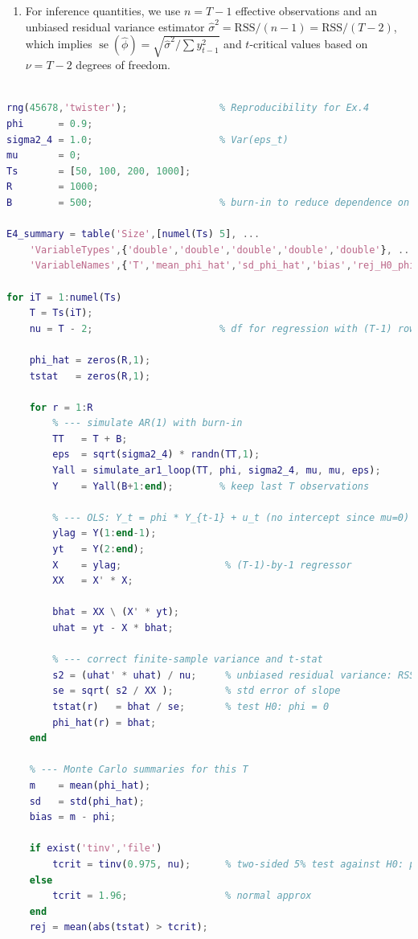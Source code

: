 \documentclass[dvipsnames,11pt]{article}
\begin{document}
\begin{solution}
\begin{enumerate}
            \item For inference quantities, we use $n=T-1$ effective observations and an unbiased residual variance estimator $\widehat\sigma^2=\text{RSS}/(n-1)=\text{RSS}/(T-2)$, which implies $\operatorname{se}(\widehat\phi)=\sqrt{\widehat\sigma^2/\sum y_{t-1}^2}$ and $t$-critical values based on $\nu=T-2$ degrees of freedom.
        \end{enumerate}

\begin{lstlisting}[language=Matlab]
% Empirical distribution of OLS AR(1) with phi = 0.9 over varying T

rng(45678,'twister');                % Reproducibility for Ex.4
phi      = 0.9;
sigma2_4 = 1.0;                      % Var(eps_t)
mu       = 0;
Ts       = [50, 100, 200, 1000];
R        = 1000;
B        = 500;                      % burn-in to reduce dependence on start

E4_summary = table('Size',[numel(Ts) 5], ...
    'VariableTypes',{'double','double','double','double','double'}, ...
    'VariableNames',{'T','mean_phi_hat','sd_phi_hat','bias','rej_H0_phi0_rate'});

for iT = 1:numel(Ts)
    T = Ts(iT);
    nu = T - 2;                      % df for regression with (T-1) rows, 1 slope

    phi_hat = zeros(R,1);
    tstat   = zeros(R,1);

    for r = 1:R
        % --- simulate AR(1) with burn-in
        TT   = T + B;
        eps  = sqrt(sigma2_4) * randn(TT,1);
        Yall = simulate_ar1_loop(TT, phi, sigma2_4, mu, mu, eps);
        Y    = Yall(B+1:end);        % keep last T observations

        % --- OLS: Y_t = phi * Y_{t-1} + u_t (no intercept since mu=0)
        ylag = Y(1:end-1); 
        yt   = Y(2:end);
        X    = ylag;                  % (T-1)-by-1 regressor
        XX   = X' * X;

        bhat = XX \ (X' * yt);
        uhat = yt - X * bhat;

        % --- correct finite-sample variance and t-stat
        s2 = (uhat' * uhat) / nu;     % unbiased residual variance: RSS/(T-2)
        se = sqrt( s2 / XX );         % std error of slope
        tstat(r)   = bhat / se;       % test H0: phi = 0
        phi_hat(r) = bhat;
    end

    % --- Monte Carlo summaries for this T
    m    = mean(phi_hat);
    sd   = std(phi_hat);
    bias = m - phi;

    if exist('tinv','file')
        tcrit = tinv(0.975, nu);      % two-sided 5% test against H0: phi = 0
    else
        tcrit = 1.96;                 % normal approx
    end
    rej = mean(abs(tstat) > tcrit);


\end{lstlisting}
\end{solution}
\end{document}
